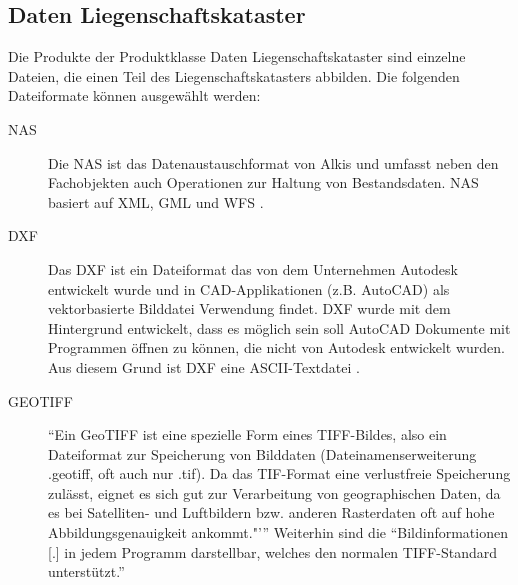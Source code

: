 \subsection{Daten Liegenschaftskataster}

Die Produkte der Produktklasse Daten Liegenschaftskataster sind einzelne Dateien, die einen Teil des Liegenschaftskatasters abbilden. Die folgenden Dateiformate können ausgewählt werden:
\begin{description}
\item[NAS] Die \ac{NAS} ist das Datenaustauschformat von Alkis und umfasst neben den Fachobjekten auch Operationen zur Haltung von Bestandsdaten. \ac{NAS} basiert auf \ac{XML}, \ac{GML} und \ac{WFS} \autocite[vgl.][]{sachsen-nas}.

\item[DXF] Das \ac{DXF} ist ein Dateiformat das von dem Unternehmen Autodesk entwickelt wurde und in \ac{CAD}-Applikationen (z.B. AutoCAD) als vektorbasierte Bilddatei Verwendung findet.
\ac{DXF} wurde mit dem Hintergrund entwickelt, dass es möglich sein soll AutoCAD Dokumente mit Programmen öffnen zu können, die nicht von Autodesk entwickelt wurden. Aus diesem Grund ist \ac{DXF} eine ASCII-Textdatei \autocite[vgl.][]{fileinfo-dxf}.

\item[GEOTIFF] \enquote{Ein GeoTIFF ist eine spezielle Form eines TIFF-Bildes, also ein Dateiformat zur Speicherung von Bilddaten (Dateinamenserweiterung .geotiff, oft auch nur .tif). Da das TIF-Format eine verlustfreie Speicherung zulässt, eignet es sich gut zur Verarbeitung von geographischen Daten, da es bei Satelliten- und Luftbildern bzw. anderen Rasterdaten oft auf hohe Abbildungsgenauigkeit ankommt."'} \autocite{wiki-geotiff} Weiterhin sind die \enquote{Bildinformationen [.] in jedem Programm darstellbar, welches den normalen TIFF-Standard unterstützt.} \autocite{wiki-geotiff}
\end{description}

